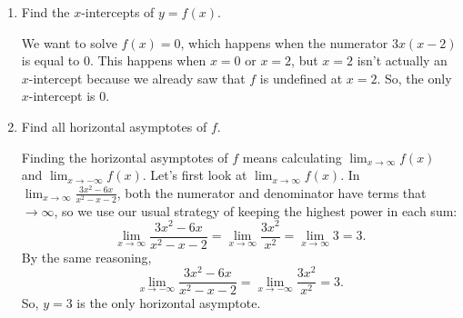 \documentclass{article}
\newcommand{\colorcancel}[2]{\renewcommand{\CancelColor}{\color{#1}}\cancel{#2}\renewcommand{\CancelColor}{\color{black}}}
\theoremstyle{theorem}
\begin{document}
\begin{enumerate}
\begin{enumerate}
\begin{solution}
      When $x$ is just a bit less than $-1$ (like $x = -1.01$), the denominator $(x - 2)(x + 1)$ is positive, so $\dfrac{3x^2 - 6x}{x^2 - x - 2} = \dfrac{\text{a number close to 9}}{\text{a number just a little bigger than 0}}$ will be very positive. Therefore, $\boxed{ \lim_{x \to -1^-} f(x) = \infty}$.

      So, $f(x)$ has a .

      Now, let's look at $\displaystyle \lim_{x \to 2} \frac{3x^2 -6x}{x^2 - x - 2}$. Here, the numerator and denominator both tend to 0, so we should try to factor and cancel something:
      \begin{align*}
        \lim_{x \to 2} \frac{3x^2 -6x}{x^2 - x - 2} &= \lim_{x \to 2} \frac{3x \colorcancel{skyblue}{(x - 2)}}{\colorcancel{skyblue}{(x - 2)}(x + 1)} \\
        &= \lim_{x \to 2} \frac{3x}{x + 1} \\
        &= \frac{6}{3}
        \end{align*}
        Therefore, $\boxed{\lim_{x \to 2} f(x) = 2}$, and $f(x)$ has a .
    \end{solution}

  \item
    \begin{problem}[\nstretch{0.25}]
      Find the $x$-intercepts of $y = f(x)$.
    \end{problem}

    \begin{solution}
      We want to solve $f(x) = 0$, which happens when the numerator $3x (x - 2)$ is equal to 0. This happens when $x = 0$ or $x = 2$, but $x = 2$ isn't actually an $x$-intercept because we already saw that $f$ is undefined at $x = 2$. So, the only $x$-intercept is $\boxed{0}$.
    \end{solution}

  \item
    \begin{problem}[\vfill]
      Find all horizontal asymptotes of $f$. 
    \end{problem}

    \begin{solution}
      Finding the horizontal asymptotes of $f$ means calculating $\displaystyle \lim_{x \to \infty} f(x)$ and $\displaystyle \lim_{x \to -\infty} f(x)$. Let's first look at $\displaystyle \lim_{x \to \infty} f(x)$. In $\displaystyle \lim_{x \to \infty} \frac{3x^2 -6x}{x^2 - x - 2}$, both the numerator and denominator have terms that $\to \infty$, so we use our usual strategy of keeping the highest power in each sum: \[ \lim_{x \to \infty} \frac{3x^2 -6x}{x^2 - x - 2} = \lim_{x \to \infty} \frac{3x^2}{x^2} = \lim_{x \to \infty} 3 = 3.\] By the same reasoning,
      \[ \lim_{x \to -\infty} \frac{3x^2 -6x}{x^2 - x - 2} = \lim_{x \to -\infty} \frac{3x^2}{x^2} = 3.\] So, $\boxed{y = 3}$ is the only horizontal asymptote.      
    \end{solution}


\end{enumerate}
\end{enumerate}
\end{document}
